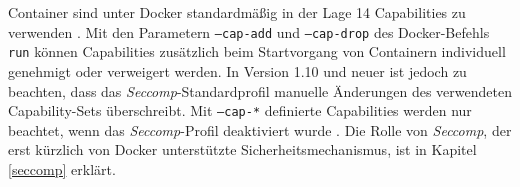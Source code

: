 \documentclass[../main.tex]{subfiles}
\begin{document}
{			Container sind unter Docker standardmäßig in der Lage 14 Capabilities zu verwenden \cite{githubCapabilities}. Mit den Parametern \texttt{--cap-add} und \texttt{--cap-drop} des Docker-Befehls \texttt{run} können Capabilities zusätzlich beim Startvorgang von Containern individuell genehmigt oder verweigert werden. In Version 1.10 und neuer ist jedoch zu beachten, dass das \emph{Seccomp}-Standardprofil manuelle Änderungen des verwendeten Capability-Sets überschreibt. Mit \texttt{--cap-*} definierte Capabilities werden nur beachtet, wenn das \emph{Seccomp}-Profil deaktiviert wurde \cite{dockerRun}. Die Rolle von \emph{Seccomp}, der erst kürzlich von Docker unterstützte Sicherheitsmechanismus, ist in Kapitel \ref{seccomp} erklärt.







}
\end{document}
